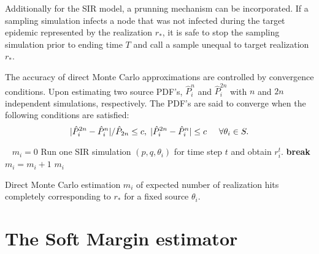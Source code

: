 \documentclass[times, utf8, diplomski]{fer}
\begin{document}
Additionally for the SIR model, a prunning mechanism can be incorporated. If a sampling simulation infects a node that was not infected during the target epidemic  represented by the realization $r_*$, it is safe to stop the sampling simulation prior to ending time $T$ and call a sample unequal to target realization $r_*$.

The accuracy of direct Monte Carlo approximations are controlled by convergence conditions. Upon estimating two source PDF's, $\hat{P}_i^n$ and $\hat{P}_i^{2n}$ with $n$ and $2n$ independent simulations, respectively. The PDF's are said to converge when the following conditions are satisfied:
\begin{equation}
| \hat{P}_i^{2n} - \hat{P}_i^{n} | / \hat{P}_{2n} \leq c, \hspace{1mm} | \hat{P}_i^{2n} - \hat{P}_i^{n} | \leq c \hspace{5mm} \forall \theta_i \in S.
\label{DMCConv}
\end{equation}

\vspace{5mm}
\begin{algorithm}[H]
\ 
 $m_i = 0$\; 
  {
    {
    Run one SIR simulation $(p, q, \theta_i)$ for time step $t$ and obtain  
    $r_i^t$.\; 
     {
   \textbf{break}\;
    }
   }
     {
  $m_i = m_i + 1$\;
 }
 }
  \Return $m_i$
 \label{DMC_lag}
 \caption{Direct Monte Carlo estimation $m_i$ of expected number of realization hits completely corresponding to $r_*$  for a fixed source $\theta_i$.}
\end{algorithm}
  \vspace{5mm}


\section{The Soft Margin estimator}
\end{document}
